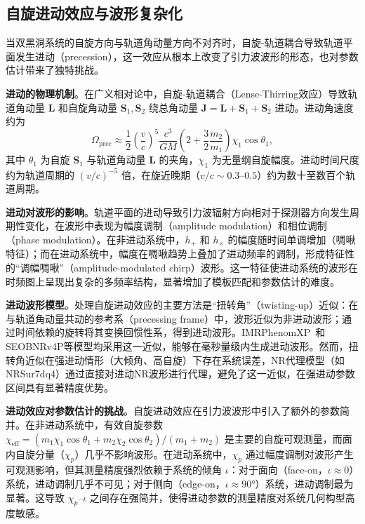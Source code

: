 \subsection{自旋进动效应与波形复杂化}

当双黑洞系统的自旋方向与轨道角动量方向不对齐时，自旋-轨道耦合导致轨道平面发生进动（precession），这一效应从根本上改变了引力波波形的形态，也对参数估计带来了独特挑战。

\textbf{进动的物理机制}。在广义相对论中，自旋-轨道耦合（Lense-Thirring效应）导致轨道角动量 $\mathbf{L}$ 和自旋角动量 $\mathbf{S}_1, \mathbf{S}_2$ 绕总角动量 $\mathbf{J} = \mathbf{L} + \mathbf{S}_1 + \mathbf{S}_2$ 进动。进动角速度约为
\begin{equation}
  \Omega_\mathrm{prec} \approx \frac{1}{2}\left(\frac{v}{c}\right)^5 \frac{c^3}{GM} \left(2 + \frac{3}{2}\frac{m_2}{m_1}\right) \chi_1 \cos\theta_1,
\end{equation}
其中 $\theta_1$ 为自旋 $\mathbf{S}_1$ 与轨道角动量 $\mathbf{L}$ 的夹角，$\chi_1$ 为无量纲自旋幅度。进动时间尺度约为轨道周期的 $(v/c)^{-5}$ 倍，在旋近晚期（$v/c \sim 0.3$--$0.5$）约为数十至数百个轨道周期。

\textbf{进动对波形的影响}。轨道平面的进动导致引力波辐射方向相对于探测器方向发生周期性变化，在波形中表现为幅度调制（amplitude modulation）和相位调制（phase modulation）。在非进动系统中，$h_+$ 和 $h_\times$ 的幅度随时间单调增加（啁啾特征）；而在进动系统中，幅度在啁啾趋势上叠加了进动频率的调制，形成特征性的“调幅啁啾”（amplitude-modulated chirp）波形。这一特征使进动系统的波形在时频图上呈现出复杂的多频率结构，显著增加了模板匹配和参数估计的难度。

\textbf{进动波形模型}。处理自旋进动效应的主要方法是“扭转角”（twisting-up）近似：在与轨道角动量共动的参考系（precessing frame）中，波形近似为非进动波形；通过时间依赖的旋转将其变换回惯性系，得到进动波形。IMRPhenomXP~\cite{Pratten2021IMRPhenomX}和SEOBNRv4P等模型均采用这一近似，能够在毫秒量级内生成进动波形。然而，扭转角近似在强进动情形（大倾角、高自旋）下存在系统误差，NR代理模型（如NRSur7dq4）通过直接对进动NR波形进行代理，避免了这一近似，在强进动参数区间具有显著精度优势。

\textbf{进动效应对参数估计的挑战}。自旋进动效应在引力波波形中引入了额外的参数简并。在非进动系统中，有效自旋参数 $\chi_\mathrm{eff} = (m_1\chi_1\cos\theta_1 + m_2\chi_2\cos\theta_2)/(m_1+m_2)$ 是主要的自旋可观测量，而面内自旋分量（$\chi_p$）几乎不影响波形。在进动系统中，$\chi_p$ 通过幅度调制对波形产生可观测影响，但其测量精度强烈依赖于系统的倾角 $\iota$：对于面向（face-on，$\iota \approx 0$）系统，进动调制几乎不可见；对于侧向（edge-on，$\iota \approx 90°$）系统，进动调制最为显著。这导致 $\chi_p$--$\iota$ 之间存在强简并，使得进动参数的测量精度对系统几何构型高度敏感。

